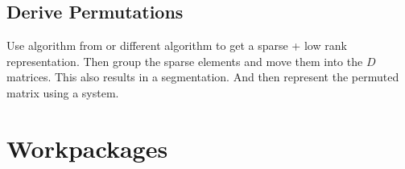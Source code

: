 \documentclass[lang=ngerman,inputenc=utf8,fontsize=10pt]{ldvarticle}
\begin{document}
\subsection*{Derive Permutations}
Use algorithm from \cite{ulfarsson_sparse_2015} or different algorithm to get a sparse + low rank representation.
Then group the sparse elements and move them into the $D$ matrices.
This also results in a segmentation.
And then represent the permuted matrix using a system. 


%
%



\section{Workpackages}
\end{document}
